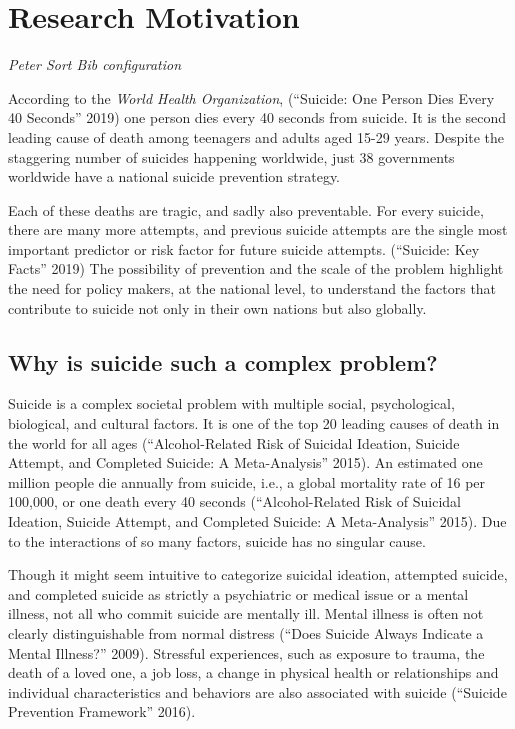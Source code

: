 \documentclass[]{article}
\begin{document}
\section{Research Motivation}\label{research-motivation}

\emph{Peter Sort Bib configuration}

According to the \emph{World Health Organization}, (``Suicide: One
Person Dies Every 40 Seconds'' 2019) one person dies every 40 seconds
from suicide. It is the second leading cause of death among teenagers
and adults aged 15-29 years. Despite the staggering number of suicides
happening worldwide, just 38 governments worldwide have a national
suicide prevention strategy.

Each of these deaths are tragic, and sadly also preventable. For every
suicide, there are many more attempts, and previous suicide attempts are
the single most important predictor or risk factor for future suicide
attempts. (``Suicide: Key Facts'' 2019) The possibility of prevention
and the scale of the problem highlight the need for policy makers, at
the national level, to understand the factors that contribute to suicide
not only in their own nations but also globally.

\subsection{Why is suicide such a complex
problem?}\label{why-is-suicide-such-a-complex-problem}

Suicide is a complex societal problem with multiple social,
psychological, biological, and cultural factors. It is one of the top 20
leading causes of death in the world for all ages (``Alcohol-Related
Risk of Suicidal Ideation, Suicide Attempt, and Completed Suicide: A
Meta-Analysis'' 2015). An estimated one million people die annually from
suicide, i.e., a global mortality rate of 16 per 100,000, or one death
every 40 seconds (``Alcohol-Related Risk of Suicidal Ideation, Suicide
Attempt, and Completed Suicide: A Meta-Analysis'' 2015). Due to the
interactions of so many factors, suicide has no singular cause.

Though it might seem intuitive to categorize suicidal ideation,
attempted suicide, and completed suicide as strictly a psychiatric or
medical issue or a mental illness, not all who commit suicide are
mentally ill. Mental illness is often not clearly distinguishable from
normal distress (``Does Suicide Always Indicate a Mental Illness?''
2009). Stressful experiences, such as exposure to trauma, the death of a
loved one, a job loss, a change in physical health or relationships and
individual characteristics and behaviors are also associated with
suicide (``Suicide Prevention Framework'' 2016).
\end{document}
